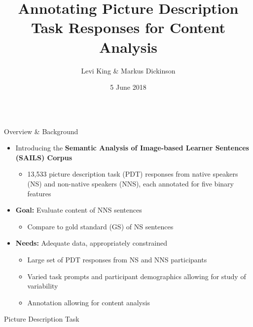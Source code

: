 \documentclass[final,t]{beamer}
\title[]{Annotating Picture Description Task Responses for Content Analysis}
\author[]{Levi King \& Markus Dickinson}
\institute[]{Indiana University}
\date[]{5 June 2018}
\begin{document}
\begin{frame}{}
  \begin{columns}[t]
    \begin{column}{.33\linewidth}

\begin{block}{Overview \& Background}
\begin{center}
\begin{minipage}{.85\textwidth}

  \begin{itemize}
    \itemsep1em
  \item{Introducing the \textbf{Semantic Analysis of Image-based Learner Sentences (SAILS) Corpus}
   \begin{itemize}
  \item 13,533 picture description task (PDT) responses from native speakers (NS) and non-native speakers (NNS), each annotated for five binary features
      \end{itemize}
    }
\end{itemize}
  \begin{itemize}
    \itemsep1em
  \item{\textbf{Goal:} Evaluate content of NNS sentences 
      \begin{itemize}
      \item Compare to gold standard (GS) of NS sentences
      \end{itemize}
    }
\end{itemize}
  
  \begin{itemize}
    \itemsep1em
  \item{\textbf{Needs:}  Adequate data, appropriately constrained
        \begin{itemize}
      \item Large set of PDT responses from NS and NNS participants
      \item Varied task prompts and participant demographics allowing for study of variability
      \item Annotation allowing for content analysis
      \end{itemize}
    }
\end{itemize}

\end{minipage}
\end{center}
\end{block}

\begin{block}{Picture Description Task}
\begin{center}
\begin{minipage}{.85\textwidth}


\end{minipage}
\end{center}
\end{block}
\end{column}
\end{columns}
\end{frame}
\end{document}
